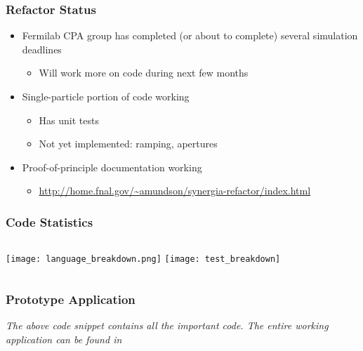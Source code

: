 \documentclass{beamer}
\begin{document}
\begin{frame}
 \frametitle{Refactor Status}
  

\begin{itemize}
  \item Fermilab CPA group has completed (or about to complete) several simulation deadlines
\begin{itemize}
  \item Will work more on code during next few months
\end{itemize}
  \item Single-particle portion of code working
\begin{itemize}
  \item Has unit tests
  \item Not yet implemented: ramping, apertures
\end{itemize}
  \item Proof-of-principle documentation working
\begin{itemize}
  \item \url{http://home.fnal.gov/~amundson/synergia-refactor/index.html}
\end{itemize}
\end{itemize}

  
 \end{frame}
\begin{frame}
 \frametitle{Code Statistics}
  

\begin{columns}
\texttt{[image: language\_breakdown.png]}
\texttt{[image: test\_breakdown]}
\end{columns}

  
 \end{frame}
\begin{frame}[shrink=42]
 \frametitle{Prototype Application}
  



\fckdplljecneiikediijkggeidikjagm



\emph{The above code snippet contains all the important code. The entire working application can be found in}

\jicaagjlckagohejccdkdbaimoobcfgd



  
 \end{frame}
\end{document}
